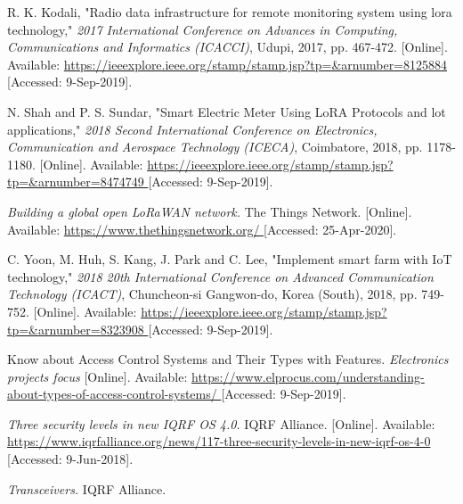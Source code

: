 \begin{thebibliography}{9}
R. K. Kodali, "Radio data infrastructure for remote monitoring system using lora technology," \textit{2017 International Conference on Advances in Computing, Communications and Informatics (ICACCI)}, Udupi, 2017, pp. 467-472.
[Online]. Available:
\url{
https://ieeexplore.ieee.org/stamp/stamp.jsp?tp=&arnumber=8125884
}
[Accessed: 9-Sep-2019].


N. Shah and P. S. Sundar, "Smart Electric Meter Using LoRA Protocols and lot applications," \textit{2018 Second International Conference on Electronics, Communication and Aerospace Technology (ICECA)}, Coimbatore, 2018, pp. 1178-1180.
[Online]. Available:
\url{
https://ieeexplore.ieee.org/stamp/stamp.jsp?tp=&arnumber=8474749
}
[Accessed: 9-Sep-2019].


\textit{
    Building a global open LoRaWAN network.
}
The Things Network.
[Online]. Available:
\url{
https://www.thethingsnetwork.org/
}
[Accessed: 25-Apr-2020].


C. Yoon, M. Huh, S. Kang, J. Park and C. Lee, "Implement smart farm with IoT technology," \textit{2018 20th International Conference on Advanced Communication Technology (ICACT)}, Chuncheon-si Gangwon-do, Korea (South), 2018, pp. 749-752.
[Online]. Available:
\url{
https://ieeexplore.ieee.org/stamp/stamp.jsp?tp=&arnumber=8323908
}
[Accessed: 9-Sep-2019].



Know about Access Control Systems and Their Types with Features. \textit{Electronics projects focus}
[Online]. Available:
\url{
https://www.elprocus.com/understanding-about-types-of-access-control-systems/
}
[Accessed: 9-Sep-2019].




\textit{
Three security levels in new IQRF OS 4.0.
}
IQRF Alliance.
[Online]. Available:
\url{
https://www.iqrfalliance.org/news/117-three-security-levels-in-new-iqrf-os-4-0
}
[Accessed: 9-Jun-2018].


\textit{
Transceivers.
}
IQRF Alliance.


\end{thebibliography}
